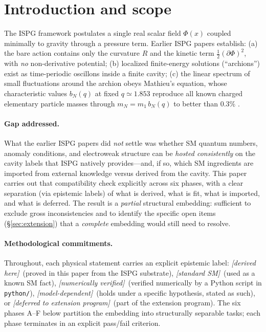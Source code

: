 \documentclass[11pt]{article}
\newcommand{\derived}{\textit{[derived here]}}
\newcommand{\fromSM}{\textit{[standard SM]}}
\newcommand{\numerical}{\textit{[numerically verified]}}
\newcommand{\deferred}{\textit{[deferred to extension program]}}
\newcommand{\modeldep}{\textit{[model-dependent]}}
\begin{document}
\tableofcontents

\section{Introduction and scope}
\label{sec:intro}

The ISPG framework
\cite{Lotishvili2026,Lotishvili2026Q} postulates a single real scalar
field $\Phi(x)$ coupled minimally to gravity through a pressure term.
Earlier ISPG papers \cite{Lotishvili2026,Lotishvili2026Q} establish:
(a) the bare action contains only the curvature $R$ and the kinetic
term $\tfrac{1}{2}(\partial\Phi)^2$, with \emph{no} non-derivative
potential; (b) localized finite-energy solutions (``archions'') exist
as time-periodic oscillons inside a finite cavity; (c) the linear
spectrum of small fluctuations around the archion obeys Mathieu's
equation, whose characteristic values $b_N(q)$ at fixed
$q\simeq 1.853$ reproduce all known charged elementary particle
masses through $m_N = m_1\,b_N(q)$ to better than $0.3\%$
\cite{McLachlan1947,DLMFMathieu,PDG2024}.

\paragraph{Gap addressed.}
What the earlier ISPG papers did \emph{not} settle was whether
SM quantum numbers, anomaly conditions, and electroweak
structure can be \emph{hosted consistently} on the cavity
labels that ISPG natively provides---and, if so, which SM
ingredients are imported from external knowledge versus derived
from the cavity. This paper carries out that compatibility
check explicitly across six phases, with a clear separation
(via epistemic labels) of what is derived, what is fit, what is
imported, and what is deferred. The result is a
\emph{partial} structural embedding: sufficient to exclude gross
inconsistencies and to identify the specific open items
(§\ref{sec:extension}) that a \emph{complete} embedding would
still need to resolve.

\paragraph{Methodological commitments.}
Throughout, each physical statement carries an explicit
epistemic label:
\derived\ (proved in this paper from the ISPG substrate),
\fromSM\ (used as a known SM fact),
\numerical\ (verified numerically by a Python script in
\texttt{python/}),
\modeldep\ (holds under a specific hypothesis, stated as such), or
\deferred\ (part of the extension program). The six phases A--F
below partition the embedding into structurally separable tasks;
each phase terminates in an explicit pass/fail criterion.
\end{document}
